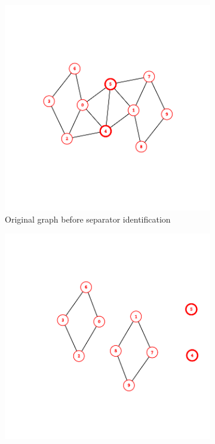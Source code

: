 \begin{figure}[htbp]
    \centering
    \begin{subfigure}[b]{0.45\textwidth}
        \centering
        \includegraphics[width=\textwidth]{fig/background/nd-1.png}
        \caption{Original graph before separator identification}
        \label{fig:nd-original}
    \end{subfigure}
    \hfill
    \begin{subfigure}[b]{0.45\textwidth}
        \centering
        \includegraphics[width=\textwidth]{fig/background/nd-2.png}

\end{subfigure}
\end{figure}
